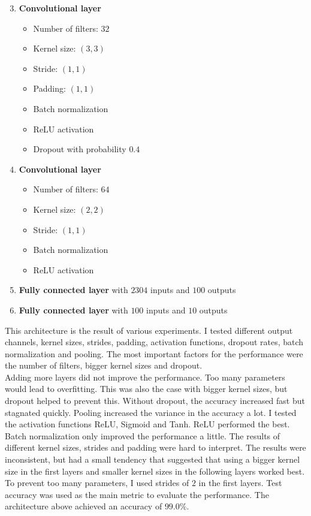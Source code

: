 \begin{minipage}[t]{0.48\linewidth}
  \begin{enumerate}
    \setcounter{enumi}{2}
    \item \textbf{Convolutional layer}
          \begin{itemize}
            \item Number of filters: $32$
            \item Kernel size: $(3, 3)$
            \item Stride: $(1, 1)$
            \item Padding: $(1, 1)$
            \item Batch normalization
            \item ReLU activation
            \item Dropout with probability $0.4$
          \end{itemize}
    \item \textbf{Convolutional layer}
          \begin{itemize}
            \item Number of filters: $64$
            \item Kernel size: $(2, 2)$
            \item Stride: $(1, 1)$
            \item Batch normalization
            \item ReLU activation
          \end{itemize}
    \item \textbf{Fully connected layer} with $2304$ inputs and $100$ outputs
    \item \textbf{Fully connected layer} with $100$ inputs and $10$ outputs
  \end{enumerate}
\end{minipage}

This architecture is the result of various experiments. I tested different output channels, kernel
sizes, strides, padding, activation functions, dropout rates, batch normalization and pooling. The
most important factors for the performance were the number of filters, bigger kernel sizes and
dropout.\\
Adding more layers did not improve the performance. Too many parameters would lead to overfitting.
This was also the case with bigger kernel sizes, but dropout helped to prevent this. Without
dropout, the accuracy increased fast but stagnated quickly. Pooling increased the variance in the
accuracy a lot. I tested the activation functions ReLU, Sigmoid and Tanh. ReLU performed the best.
Batch normalization only improved the performance a little. The results of different kernel sizes,
strides and padding were hard to interpret. The results were inconsistent, but had a small tendency
that suggested that using a bigger kernel size in the first layers and smaller kernel sizes in the
following layers worked best. To prevent too many parameters, I used strides of $2$ in the first
layers. Test accuracy was used as the main metric to evaluate the performance. The architecture
above achieved an accuracy of $99.0\%$.

